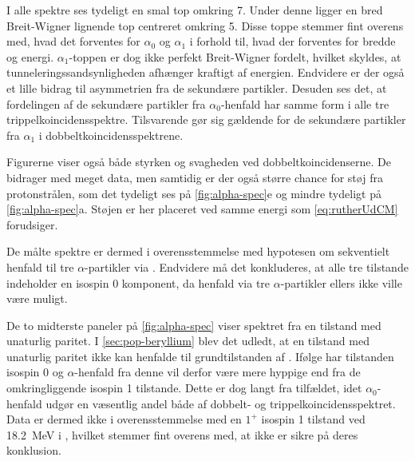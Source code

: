 
I alle spektre ses tydeligt en smal top omkring 7\MeV. Under denne ligger en bred Breit-Wigner
lignende top centreret omkring 5\MeV. Disse toppe stemmer fint overens med, hvad det forventes for
$\alpha_{0}$ og $\alpha_{1}$ i forhold til, hvad der forventes for bredde og energi.
$\alpha_{1}$-toppen er dog ikke perfekt Breit-Wigner fordelt, hvilket skyldes, at
tunneleringssandsynligheden afhænger kraftigt af energien. Endvidere er der også et lille bidrag til
asymmetrien fra de sekundære partikler. Desuden ses det, at fordelingen af de sekundære partikler
fra $\alpha_{0}$-henfald har samme form i alle tre trippelkoincidensspektre. Tilsvarende gør sig gældende
for de sekundære partikler fra $\alpha_{1}$ i dobbeltkoincidensspektrene.

Figurerne viser også både styrken og svagheden ved dobbeltkoincidenserne. De bidrager med meget
data, men samtidig er der også større chance for støj fra protonstrålen, som det tydeligt ses på
\cref{fig:alpha-spec}e og mindre tydeligt på \cref{fig:alpha-spec}a. Støjen er her placeret ved
samme energi som \cref{eq:rutherUdCM} forudsiger.

De målte spektre er dermed i overensstemmelse med hypotesen om sekventielt henfald til tre
$\alpha$-partikler via \Be. Endvidere må det konkluderes, at alle tre tilstande indeholder en isospin 0
komponent, da henfald via tre $\alpha$-partikler ellers ikke ville være muligt. 

De to midterste paneler på \cref{fig:alpha-spec} viser spektret fra en tilstand med unaturlig paritet. I
\cref{sec:pop-beryllium} blev det udledt, at en tilstand med unaturlig paritet ikke kan henfalde til
grundtilstanden af \Be. Ifølge \cite{States} har tilstanden isospin 0 og $\alpha$-henfald fra denne vil
derfor være mere hyppige end fra de omkringliggende isospin 1 tilstande. Dette er dog langt fra
tilfældet, idet $\alpha_{0}$-henfald udgør en væsentlig andel både af dobbelt- og
trippelkoincidensspektret. Data er dermed ikke i overensstemmelse med en $1^{+}$ isospin 1 tilstand
ved \SI{18.2}{\MeV} i \Carb, hvilket stemmer fint overens med, at \cite{States} ikke er sikre på
deres konklusion.


